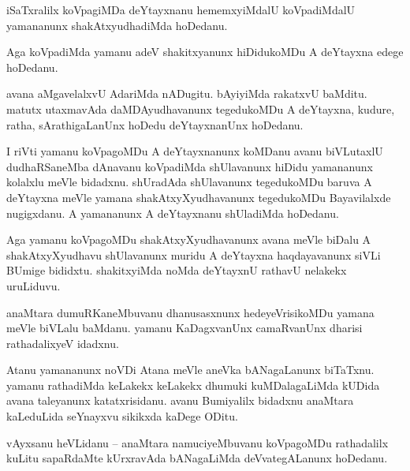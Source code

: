 \documentclass{article}
\begin{document}
\begin{mng}%
iSaTxralilx koVpagiMDa deYtayxnanu hememxyiMdalU koVpadiMdalU yamananunx shakAtxyudhadiMda hoDedanu.
\end{mng}

\begin{mng}%
Aga koVpadiMda yamanu adeV shakitxyanunx hiDidukoMDu A deYtayxna edege hoDedanu.
\end{mng}

\begin{mng}%
avana aMgavelalxvU AdariMda nADugitu. bAyiyiMda rakatxvU baMditu. matutx utaxmavAda 
daMDAyudhavanunx tegedukoMDu A deYtayxna, kudure, ratha, sArathigaLanUnx hoDedu deYtayxnanUnx 
hoDedanu.
\end{mng}

\begin{mng}%
I riVti yamanu koVpagoMDu A deYtayxnanunx koMDanu avanu biVLutaxlU dudhaRSaneMba dAnavanu 
koVpadiMda shUlavanunx hiDidu yamananunx kolalxlu meVle bidadxnu. shUradAda shUlavanunx 
tegedukoMDu baruva A deYtayxna meVle yamana shakAtxyXyudhavanunx tegedukoMDu Bayavilalxde 
nugigxdanu. A yamananunx A deYtayxnanu shUladiMda hoDedanu.
\end{mng}

\begin{mng}%
Aga yamanu koVpagoMDu shakAtxyXyudhavanunx avana meVle biDalu A shakAtxyXyudhavu shUlavanunx muridu 
A deYtayxna haqdayavanunx siVLi BUmige bididxtu. shakitxyiMda noMda deYtayxnU rathavU nelakekx 
uruLiduvu.
\end{mng}

\begin{mng}%
anaMtara dumuRKaneMbuvanu dhanusasxnunx hedeyeVrisikoMDu yamana  meVle biVLalu baMdanu. yamanu 
KaDagxvanUnx camaRvanUnx dharisi rathadalixyeV idadxnu.
\end{mng}

\begin{mng}%
Atanu yamananunx noVDi Atana meVle aneVka bANagaLanunx biTaTxnu. yamanu rathadiMda keLakekx 
keLakekx dhumuki kuMDalagaLiMda kUDida avana taleyanunx katatxrisidanu. avanu Bumiyalilx bidadxnu 
anaMtara kaLeduLida seYnayxvu sikikxda kaDege ODitu.
\end{mng}


\begin{mng}%
vAyxsanu heVLidanu -- anaMtara namuciyeMbuvanu koVpagoMDu rathadalilx kuLitu sapaRdaMte kUrxravAda 
bANagaLiMda deVvategALanunx hoDedanu.
\end{mng}
\end{document}

